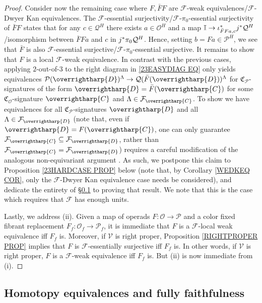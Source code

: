 \documentclass[a4paper,10pt
,draft
]{article}%
\numberwithin{equation}{section}
\numberwithin{figure}{section}
\theoremstyle{definition} %
\newcommand{\vect}[1]{\text{\overrightharp{\ensuremath{#1}}}}
\newcommand{\F}{\ensuremath{\mathcal F}}
\newcommand{\V}{\ensuremath{\mathcal V}}
\renewcommand{\O}{\ensuremath{\mathcal O}}
\renewcommand{\P}{\ensuremath{\mathcal P}}
\newcommand{\1}{\ensuremath{\mathbbm 1}}%
\begin{document}
\begin{proof}
Consider now the remaining case where
$F,\bar{F}F$ are
$\F$-weak equivalences/$\F$-Dwyer Kan equivalences.
The $\F$-essential surjectivity/$\F$-$\pi_0$-essential surjectivity
of $\bar{F}F$
states that for any $c \in \mathcal{Q}^H$
there exists $a \in \mathcal{O}^H$ and a map
$\mathbb{I} \to \iota^{\**}_{\bar{F}Fa,c} j^{\**}\mathcal{Q}^H$
/isomorphism between $\bar{F}Fa$ and 
$c$ in $j^{\**}\pi_0\mathcal{Q}^H$.
Hence, setting $b = Fa \in \mathcal{P}^H$,
we see that $\bar{F}$ is also
$\F$-essential surjective/$\F$-$\pi_0$-essential surjective.
It remains to show that
$F$ is a local $\F$-weak equivalence.
In contrast with the previous cases,
applying $2$-out-of-$3$ to the right diagram in \eqref{23EASYDIAG EQ}
only yields equivalences 
$\P(\vect{D})^{\Lambda} \to \mathcal{Q}(\bar{F}(\vect{D}))^{\Lambda}$
for $\mathfrak{C}_{\P}$-signatures of the form
$\vect{D} = \bar{F} (\vect{C})$ for some $\mathfrak{C}_{\O}$-signature $\vect{C}$ 
and $\Lambda \in \F_{\vect{C}}$.
To show we have equivalences for all
$\mathfrak{C}_{\P}$-signatures $\vect{D}$
and all $\Lambda \in \F_{\vect{D}}$
(note that, even if $\vect{D} = F(\vect{C})$,
one can only guarantee $\F_{\vect{C}} \subseteq \F_{\vect{D}}$,
rather than $\F_{\vect{C}} = \F_{\vect{D}}$)
requires a careful modification of the analogous non-equivariant argument \cite[Lemma 4.14]{Cav}.
As such, we postpone this claim to 
Proposition \ref{23HARDCASE PROP} below
(note that, by Corollary \ref{WEDKEQ COR}, 
only the $\F$-Dwyer Kan equivalence case needs be considered),
and dedicate the entirety of \S \ref{HMTYEQ SEC}
to proving that result.
We note that this is the case which requires that $\F$ has enough units.


Lastly, we address (ii).
Given a map of operads $F\colon \O \to \P$ and a color fixed fibrant replacement
$F_f \colon \O_f \to \P_f$,
it is immediate that 
$F$ is a $\F$-local weak equivalence iff $F_f$ is.
Moreover, if $\V$ is right proper, Proposition \ref{RIGHTPROPER PROP}
implies that $F$ is $\F$-essentially surjective iff $F_f$ is.
In other words, if $\V$ is right proper,
$F$ is a $\F$-weak equivalence iff $F_f$ is.
But (ii) is now immediate from (i).
\end{proof}






\subsection{Homotopy equivalences and fully faithfulness}
\label{HMTYEQ SEC}
\end{document}
